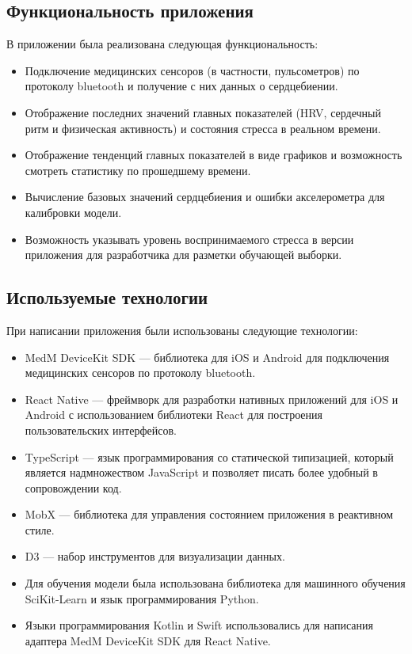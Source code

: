 \documentclass[14pt]{matmex-diploma-custom}
\begin{document}
\subsection{Функциональность приложения}
В приложении была реализована следующая функциональность:
\begin{itemize}
\item Подключение медицинских сенсоров (в частности, пульсометров) по протоколу
  bluetooth и получение с них данных о сердцебиении.
\item Отображение последних значений главных показателей (HRV, сердечный ритм и
  физическая активность) и состояния стресса в реальном времени.
\item Отображение тенденций главных показателей в виде графиков и возможность
  смотреть статистику по прошедшему времени.
\item Вычисление базовых значений сердцебиения и ошибки акселерометра для калибровки модели.
\item Возможность указывать уровень воспринимаемого стресса в версии приложения
  для разработчика для разметки обучающей выборки.
\end{itemize}

\subsection{Используемые технологии}
При написании приложения были использованы следующие технологии:
\begin{itemize}
\item MedM DeviceKit SDK --- библиотека для iOS и Android для подключения
  медицинских сенсоров по протоколу bluetooth.
\item React Native --- фреймворк для разработки нативных приложений для iOS и
  Android с использованием библиотеки React для построения пользовательских
  интерфейсов.
\item TypeScript --- язык программирования со статической типизацией, который
  является надмножеством JavaScript и позволяет писать более удобный в
  сопровождении код.
\item MobX --- библиотека для управления состоянием приложения в реактивном
  стиле.
\item D3 --- набор инструментов для визуализации данных.
\item Для обучения модели была использована библиотека для машинного обучения
  SciKit-Learn и язык программирования Python.
\item Языки программирования Kotlin и Swift использовались для написания
  адаптера MedM DeviceKit SDK для React Native.
\end{itemize}
\end{document}
